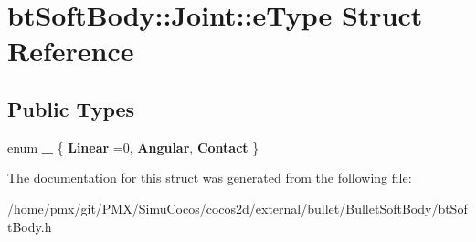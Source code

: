 \hypertarget{structbtSoftBody_1_1Joint_1_1eType}{}\section{bt\+Soft\+Body\+:\+:Joint\+:\+:e\+Type Struct Reference}
\label{structbtSoftBody_1_1Joint_1_1eType}
\subsection*{Public Types}
\begin{DoxyCompactItemize}
\item 
\mbox{\label{structbtSoftBody_1_1Joint_1_1eType_adad1e35fb02127d7138d3b28b87eab20}} 
enum {\bfseries \+\_\+} \{ {\bfseries Linear} =0, 
{\bfseries Angular}, 
{\bfseries Contact}
 \}
\end{DoxyCompactItemize}


The documentation for this struct was generated from the following file\+:\begin{DoxyCompactItemize}
\item 
/home/pmx/git/\+P\+M\+X/\+Simu\+Cocos/cocos2d/external/bullet/\+Bullet\+Soft\+Body/bt\+Soft\+Body.\+h\end{DoxyCompactItemize}

